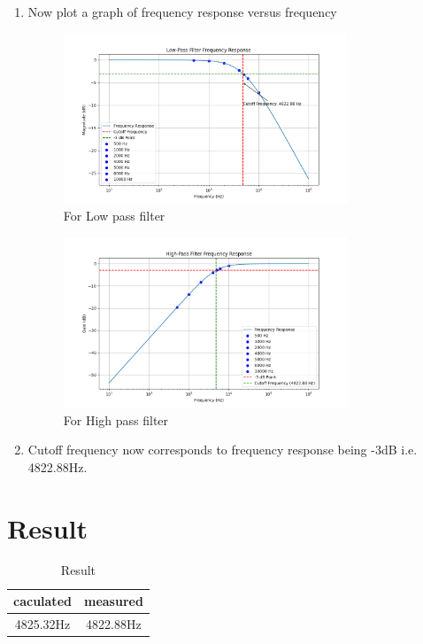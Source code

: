 \documentclass[a4paper,12pt]{article}
\begin{document}
\begin{enumerate}
\item Now plot a graph of frequency response versus frequency

\begin{figure}[H]
    \centering
    \includegraphics[width=0.8\textwidth]{1.png}
    \caption{For Low pass filter}
    \label{fig}
\end{figure}

\begin{figure}[H]
    \centering
    \includegraphics[width=0.8\textwidth]{2.png}
    \caption{For High pass filter}
    \label{fig}
\end{figure}

\item Cutoff frequency now corresponds to frequency response being -3dB i.e. 4822.88Hz. 
\end{enumerate}

\section{Result}

\begin{table}[H]
  \centering
  \begin{tabular}{|c|c|}
    \hline
    caculated & measured \\
    \hline
    4825.32Hz & 4822.88Hz  \\
    \hline
  \end{tabular}
  \caption{Result}
\end{table}
\end{document}
